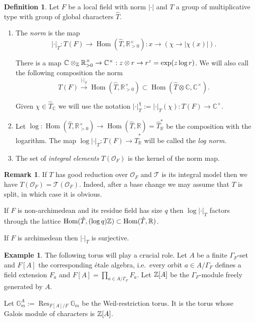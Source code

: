 \documentclass[a4paper,11pt,reqno]{amsart}
\newcommand{\R}{\mathbb{R}}
\newcommand{\C}{\mathbb{C}}
\newcommand{\G}{\mathbb{G}}
\DeclareMathOperator{\Hom}{Hom}
\DeclareMathOperator{\Res}{Res}
\theoremstyle{definition}
\newtheorem{definition}[theorem]{Definition}
\newtheorem{example}[theorem]{Example}
\newtheorem{remark}[theorem]{Remark}
\begin{document}
\begin{definition}
	Let $F$ be a local field with norm $|\cdot|$ and $T$ a group of multiplicative type with group of global characters $\hat{T}$.
	\begin{enumerate}
		\item The \emph{norm} is the map
		\begin{equation*}
			|\cdot|_T: T(F) \to \Hom(\hat{T}, \R_{>0}^{\times}): x \to (\chi \to |\chi(x)|).
		\end{equation*}
	
		There is a map $\C \otimes_{\Z} \R_{>0}^{\times} \to \C^{\times}: z \otimes r \to r^{z} = \exp(z\log r )$. We will also call the following composition the norm
		\begin{equation*}
			T(F) \xrightarrow{|\cdot|_T} \Hom(\hat{T}, \R_{>0}^{\times}) \subset \Hom(\hat{T} \otimes \C	, \C^{\times}).
		\end{equation*}
	
		Given $\chi \in \hat{T}_{\C}$ we will use the notation $|\cdot|_T^{\chi} := |\cdot|_T(\chi): T(F) \to \C^{\times}$.
		
		\item Let $\log: \Hom(\hat{T}, \R_{>0}^{\times}) \to \Hom(\hat{T}, \R) = \hat{T}^{*}_{\R}$ be the composition with the logarithm. The map $\log |\cdot|_T: T(F) \to \hat{T}^{*}_{\R}$ will be called the \emph{log norm}.
		\item The set of \emph{integral elements} $T(\mathcal{O}_F)$ is the kernel of the norm map.
	\end{enumerate}
	
	\begin{remark}
		If $T$ has good reduction over $\mathcal{O}_F$ and $\mathcal{T}$ is its integral model then we have $T(\mathcal{O}_F) = \mathcal{T}(\mathcal{O}_F)$. Indeed, after a base change we may assume that $T$ is split, in which case it is obvious.
	
		If $F$ is non-archimedean and its residue field has size $q$ then $\log |\cdot|_T$ factors through the lattice $\Hom(\hat{T}, (\log q )\Z) \subset \Hom(\hat{T}, \R)$. 
	
		If $F$ is archimedean then $|\cdot|_T$ is surjective.
	\end{remark}
\end{definition}
\begin{example}
	The following torus will play a crucial role. Let $A$ be a finite $\Gamma_F$-set and $F[A]$ the corresponding \'etale algebra, i.e.~every orbit $a \in A / \Gamma_F$ defines a field extension $F_a$ and $F[A] = \prod_{a \in A /\Gamma_F} F_a$. Let $\mathbb{Z}[A]$ be the $\Gamma_F$-module freely generated by $A$.
	
	Let $\G_m^A := \Res_{F[A]/F} \G_m$ be the Weil-restriction torus. It is the torus whose Galois module of characters is $\mathbb{Z}[A]$. 
\end{example}
\end{document}
